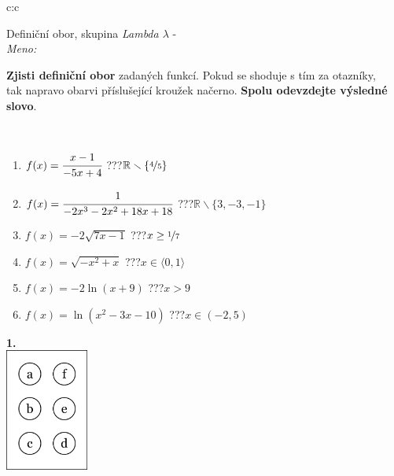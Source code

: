\documentclass[10pt]{report}
\begin{document}
\begin{tabular}{c:c}
\begin{minipage}[c][104.5mm][t]{0.5\linewidth}
\begin{center}
\vspace{7mm}
{\huge Definiční obor, skupina \textit{Lambda $\lambda$} -}\\[5mm]
\textit{Meno:}\phantom{xxxxxxxxxxxxxxxxxxxxxxxxxxxxxxxxxxxxxxxxxxxxxxxxxxxxxxxxxxxxxxxxx}\\[5mm]
\begin{minipage}{0.95\linewidth}
\textbf{Zjisti definiční obor} zadaných funkcí. Pokud se shoduje s tím za otazníky,\\tak napravo obarvi příslušející kroužek načerno. \textbf{Spolu odevzdejte výsledné slovo}.
\end{minipage}
\\[1mm]
\begin{minipage}{0.79\linewidth}
\begin{center}
\begin{varwidth}{\linewidth}
\begin{enumerate}
\normalsizerrr
\item $f(x)=\cfrac{x-1}{-5x+4}$\quad \dotfill\; ???\;\dotfill \quad $\mathbb{R}\smallsetminus\{\nicefrac{4}{5}\}$
\item $f(x)=\cfrac{1}{-2x^3-2x^2+18x+18}$\quad \dotfill\; ???\;\dotfill \quad $\mathbb{R}\smallsetminus\{3,-3,-1\}$
\item $f(x)=-2\sqrt{7x-1}$\quad \dotfill\; ???\;\dotfill \quad $x\geq\nicefrac{1}{7}$
\item $f(x)=\sqrt{-x^2+x}$\quad \dotfill\; ???\;\dotfill \quad $x\in\langle0 , 1\rangle$
\item $f(x)=-2\ln{(x+9)}$\quad \dotfill\; ???\;\dotfill \quad $x>9$
\item $f(x)=\ln{(x^2-3x-10)}$\quad \dotfill\; ???\;\dotfill \quad $x\in(-2 , 5)$
\end{enumerate}
\end{varwidth}
\end{center}
\end{minipage}
\begin{minipage}{0.20\linewidth}
\begin{center}
{\Huge\bfseries 1.} \\[2mm]
\includegraphics[height=40mm]{../images/braille.png}

\end{center}
\end{minipage}
\end{center}
\end{minipage}
\end{tabular}
\end{document}
